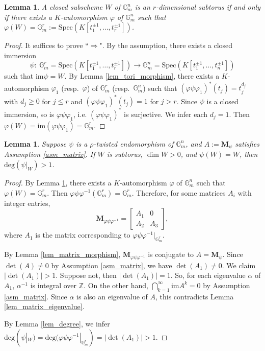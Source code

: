 \documentclass[12pt]{amsart}
\theoremstyle{plain}
\newtheorem{lemma}[theorem]{Lemma}
\theoremstyle{definition}
\theoremstyle{question}
\theoremstyle{remark}
\theoremstyle{assumption}
\numberwithin{equation}{section}
\theoremstyle{bigthm}
\begin{document}
\begin{lemma}\label{lem_subtorus}
A closed subscheme $W$ of $\mathbb{G}_{m}^{n}$ is an $r$-dimensional subtorus if and only if there exists a $K$-automorphism $\varphi$ of $\mathbb{G}_{m}^{n}$ such that $\varphi (W) = \mathbb{G}_{m}^{r} := \mathrm{Spec}(K[t_{1}^{\pm 1}, \dots, t_{r}^{\pm 1}])$.
\end{lemma}
\begin{proof}
It suffices to prove ``$\Rightarrow$". By the assumption, there exists a closed immersion
\[
\psi \colon \ \mathbb{G}_{m}^{r} = \mathrm{Spec}(K[t_{1}^{\pm 1}, \dots, t_{r}^{\pm 1}]) \rightarrow \mathbb{G}_{m}^{n} = \mathrm{Spec}(K[t_{1}^{\pm 1}, \dots, t_{n}^{\pm 1}])
\]
such that $\mathrm{im} \psi = W$. By Lemma \ref{lem_tori_morphism}, there exists a $K$-automorphism $\varphi_{1}$ (resp.~$\varphi$) of $\mathbb{G}_{m}^{r}$ (resp.~$\mathbb{G}_{m}^{n}$) such that $(\varphi \psi \varphi_{1})^{*} (t_{j}) = t_{j}^{d_{j}}$ with $d_{j} \ge 0$ for $j \le r$ and $(\varphi \psi \varphi_{1})^{*} (t_{j}) = 1$ for $j>r$. Since $\psi$ is a closed immersion, so is $\varphi \psi \varphi_{1}$, i.e. $(\varphi \psi \varphi_{1})^{*}$ is surjective. We infer each $d_{j} =1$. Then $\varphi (W) = \mathrm{im} (\varphi \psi \varphi_{1}) = \mathbb{G}_{m}^{r}$.
\end{proof}

\begin{lemma}\label{lem_subtorus_degree}
Suppose $\psi$ is a $\rho$-twisted endomorphism of $\mathbb{G}_{m}^{n}$, and $A := \mathbf{M}_{\psi}$ satisfies Assumption \ref{asm_matrix}. If $W$ is subtorus, $\dim W >0$, and $\psi (W) = W$, then $\mathrm{deg} (\psi|_{W}) >1$.
\end{lemma}
\begin{proof}
By Lemma \ref{lem_subtorus}, there exists a $K$-automorphism $\varphi$ of $\mathbb{G}_{m}^{n}$ such that $\varphi (W) = \mathbb{G}_{m}^{r}$. Then $\varphi \psi \varphi^{-1} (\mathbb{G}_{m}^{r}) = \mathbb{G}_{m}^{r}$. Therefore, for some matrices $A_{i}$ with integer entries,
\[
\mathbf{M}_{\varphi \psi \varphi^{-1}} =
\begin{bmatrix}
A_{1} & 0 \\
A_{2} & A_{3}
\end{bmatrix},
\]
where $A_{1}$ is the matrix corresponding to $\varphi \psi \varphi^{-1}|_{\mathbb{G}_{m}^{r}}$.

By Lemma \ref{lem_matrix_morphism}, $\mathbf{M}_{\varphi \psi \varphi^{-1}}$ is conjugate to $A= \mathbf{M}_{\psi}$. Since $\det (A) \ne 0$ by Assumption \ref{asm_matrix}, we have $\det (A_{1}) \ne 0$. We claim $|\det (A_{1})| >1$. Suppose not, then $|\det (A_{1})| =1$. So, for each eigenvalue $\alpha$ of $A_{1}$, $\alpha^{-1}$ is integral over $\mathbb{Z}$. On the other hand, $\bigcap_{k=1}^{\infty} \mathrm{im} A^{k} =0$ by Assumption \ref{asm_matrix}. Since $\alpha$ is also an eigenvalue of $A$, this contradicts Lemma \ref{lem_matrix_eigenvalue}.

By Lemma \ref{lem_degree}, we infer $\mathrm{deg} (\psi|_{W}) = \mathrm{deg} (\varphi \psi \varphi^{-1}|_{\mathbb{G}_{m}^{r}}) = |\det (A_{1})| >1$.
\end{proof}
\end{document}
